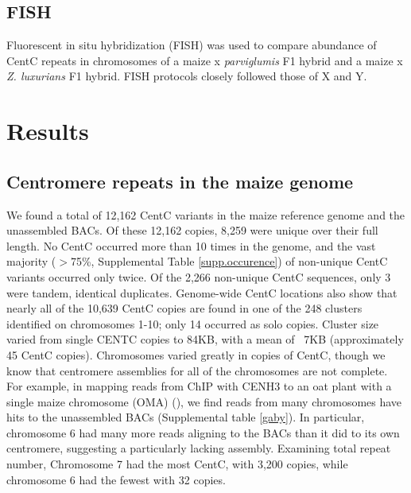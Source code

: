 \subsection*{FISH}

Fluorescent in situ hybridization (FISH) was used to compare abundance of CentC repeats in chromosomes of a maize x \emph{parviglumis} F1 hybrid and a maize x \emph{Z. luxurians} F1 hybrid. FISH protocols closely followed those of X and Y.

\section*{Results}
\label{results}

\subsection*{Centromere repeats in the maize genome}

We found a total of 12,162 CentC variants in the maize reference genome and the unassembled BACs.  Of these 12,162 copies, 8,259 were unique over their full length. No CentC occurred more than 10 times in the genome, and the vast majority ($>$75\%, Supplemental Table \ref{supp.occurence}) of non-unique CentC variants occurred only twice.  Of the 2,266 non-unique CentC sequences, only 3 were tandem, identical duplicates.  Genome-wide CentC locations also show that nearly all of the 10,639 CentC copies are found in one of the 248 clusters identified on chromosomes 1-10; only 14 occurred as solo copies.  Cluster size varied from single CENTC copies to 84KB, with a mean of ~7KB (approximately 45 CentC copies). Chromosomes varied greatly in copies of CentC, though we know that centromere assemblies for all of the chromosomes are not complete.   For example, in mapping reads from ChIP with CENH3 to an oat plant with a single maize chromosome (OMA) (), we find reads from many chromosomes have hits to the unassembled BACs (Supplemental table \ref{gaby}).  In particular, chromosome 6 had many more reads aligning to the BACs than it did to its own centromere, suggesting a particularly lacking assembly.  Examining total repeat number, Chromosome 7 had the most CentC, with 3,200 copies, while chromosome 6 had the fewest with 32 copies.  

